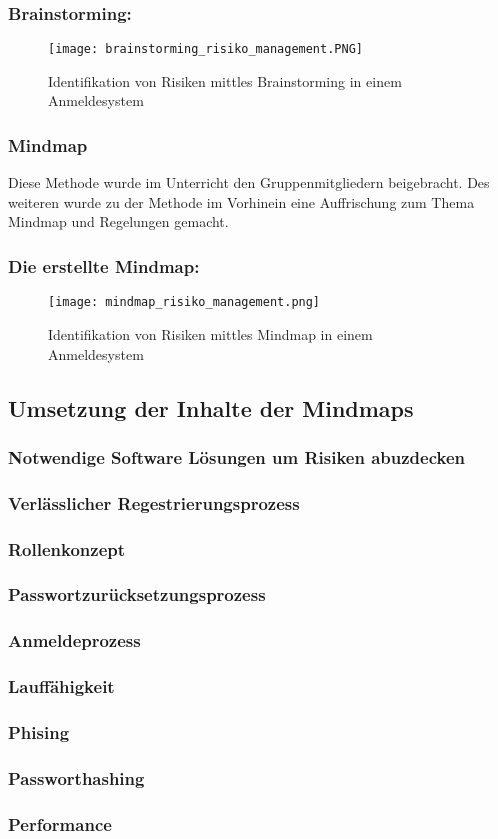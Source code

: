\subsubsection{Brainstorming:}
\begin{center}
\begin{figure}[h]
    \centering
    \texttt{[image: brainstorming\_risiko\_management.PNG]}
    \caption{Identifikation von Risiken mittles Brainstorming in einem Anmeldesystem}
\end{figure}
\end{center}

\newpage
\subsubsection{Mindmap}
Diese Methode wurde im Unterricht den Gruppenmitgliedern beigebracht. Des weiteren wurde zu der Methode im Vorhinein eine Auffrischung zum Thema Mindmap und Regelungen gemacht.

\subsubsection{Die erstellte Mindmap:}
\begin{center}
\begin{figure}[h]
    \centering
    \texttt{[image: mindmap\_risiko\_management.png]}
    \caption{Identifikation von Risiken mittles Mindmap in einem Anmeldesystem}
\end{figure}
\end{center}

\subsection{Umsetzung der Inhalte der Mindmaps}
\subsubsection{Notwendige Software Lösungen um Risiken abuzdecken}
\subsubsection{Verlässlicher Regestrierungsprozess}
\subsubsection{Rollenkonzept}
\subsubsection{Passwortzurücksetzungsprozess}
\subsubsection{Anmeldeprozess}
\subsubsection{Lauffähigkeit}
\subsubsection{Phising}
\subsubsection{Passworthashing}
\subsubsection{Performance}
